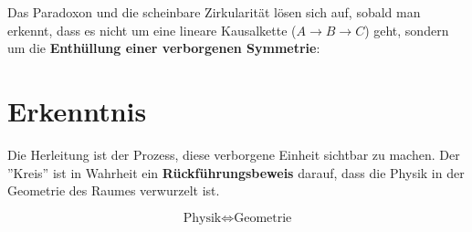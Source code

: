 \documentclass[12pt, a4paper]{article}
\begin{document}
Das Paradoxon und die scheinbare Zirkularität lösen sich auf, sobald man erkennt, dass es nicht um eine lineare Kausalkette ($A \rightarrow B \rightarrow C$) geht, sondern um die \textbf{Enthüllung einer verborgenen Symmetrie}:

\begin{center}
\end{center}

\section*{Erkenntnis}

Die Herleitung ist der Prozess, diese verborgene Einheit sichtbar zu machen. Der ''Kreis'' ist in Wahrheit ein \textbf{Rückführungsbeweis} darauf, dass die Physik in der Geometrie des Raumes verwurzelt ist.

\[
\boxed{\text{Physik} \Leftrightarrow \text{Geometrie}}
\]
\end{document}
